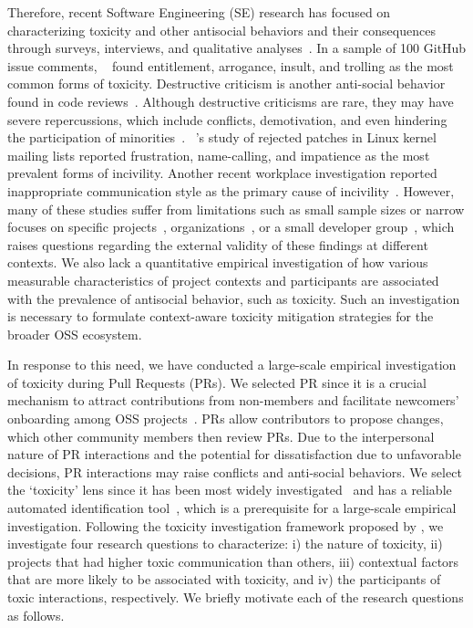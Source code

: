 Therefore, recent Software Engineering (SE) research has focused on characterizing {toxicity and other} antisocial behaviors and their consequences through surveys, interviews, and qualitative analyses~\cite{ferreira2021shut,miller2022did,egelman2020predicting,gunawardena2022destructive,ferreira2022heated}. 
In a sample of 100 GitHub issue comments, ~\citet{miller2022did} found entitlement, arrogance, insult, and trolling as the most common forms of toxicity. Destructive criticism is another anti-social behavior found in code reviews~\cite{gunawardena2022destructive}. Although destructive criticisms are rare, they may have severe repercussions, which include conflicts, demotivation, and even hindering the participation of minorities~\cite{gunawardena2022destructive, egelman2020predicting}. 
~\citet{ferreira2021shut}'s study of rejected patches in Linux kernel mailing lists reported frustration, name-calling, and impatience as the most prevalent forms of incivility. Another recent workplace investigation reported inappropriate communication style as the primary cause of incivility~\cite{rahman2024words}.  
However, many of these studies suffer from limitations such as small sample sizes or narrow focuses on specific projects~\cite{ferreira2022heated,miller2022did},  organizations~\cite{qiu2022detecting,egelman2020predicting}, or a small developer group~\cite{rahman2024words}, which raises questions regarding the external validity of these findings at different contexts.  We also lack a quantitative empirical investigation of how various measurable characteristics of project contexts and participants are associated with the prevalence of antisocial behavior, such as toxicity.  
Such an investigation is necessary to formulate context-aware toxicity mitigation strategies for the broader OSS ecosystem. 


In response to this need, we have conducted a large-scale empirical investigation of toxicity during  Pull Requests (PRs). 
We selected PR since it is a crucial mechanism to attract contributions from non-members and facilitate newcomers' onboarding among OSS projects~\cite{gousios2014exploratory}. PRs allow contributors to propose changes, which other community members then review PRs. Due to the interpersonal nature of PR interactions and the potential for dissatisfaction due to unfavorable decisions, PR interactions may raise conflicts and anti-social behaviors. We select the `toxicity' lens since it has been most widely investigated~\cite{raman2020stress,miller2022did,sarker-esem-2023,sarker2020benchmark} and has a reliable automated identification tool~\cite{sarker2022automated}, which is a prerequisite for a large-scale empirical investigation. 
 Following the toxicity investigation framework proposed by \citet{miller2022did}, we investigate four research questions to characterize: i) the nature of toxicity, ii) projects that had higher toxic communication than others, iii) contextual factors that are more likely to be associated with toxicity, and iv) the participants of toxic interactions, respectively. We briefly motivate each of the research questions as follows.
 

